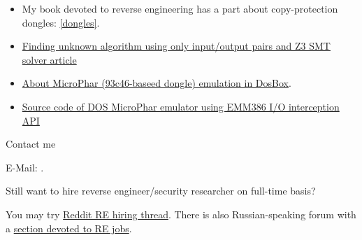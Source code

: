 \begin{itemize}
\item My book devoted to reverse engineering has a part about copy-protection dongles: \ref{dongles}.
\item \href{http://yurichev.com/writings/z3_rockey.pdf}{Finding unknown algorithm using only input/output pairs and Z3 SMT solver article}
\item \href{http://yurichev.com/blog/56/}{About MicroPhar (93c46-baseed dongle) emulation in DosBox}.
\item \href{http://conus.info/dongle/src/microph.asm}{Source code of DOS MicroPhar emulator using EMM386 I/O interception API}
\end{itemize}

\Large Contact me \normalsize

E-Mail: \GTT{\EMAIL}.

\Large Still want to hire reverse engineer/security researcher on full-time basis? \normalsize

You may try \href{https://www.reddit.com/r/ReverseEngineering/comments/49cza0/rreverseengineerings_2015_triannual_hiring_thread/}{Reddit RE hiring thread}.
There is also Russian-speaking forum with a \href{https://forum.reverse4you.org/forumdisplay.php?f=252}{section devoted to RE jobs}.

\fi %

\vspace*{\fill}
\vfill
